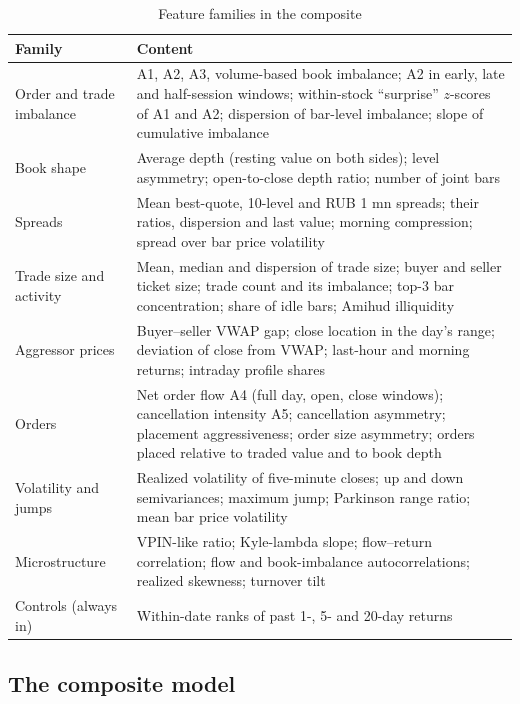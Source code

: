 \begin{table}[htbp]
\centering
\caption{Feature families in the composite}\label{tab:families}
\small
\begin{tabularx}{\textwidth}{@{}R{3.1cm}L@{}}
\toprule
Family & Content \\
\midrule
Order and trade imbalance & A1, A2, A3, volume-based book imbalance; A2 in early, late and half-session windows; within-stock ``surprise'' $z$-scores of A1 and A2; dispersion of bar-level imbalance; slope of cumulative imbalance \\
Book shape & Average depth (resting value on both sides); level asymmetry; open-to-close depth ratio; number of joint bars \\
Spreads & Mean best-quote, 10-level and RUB 1 mn spreads; their ratios, dispersion and last value; morning compression; spread over bar price volatility \\
Trade size and activity & Mean, median and dispersion of trade size; buyer and seller ticket size; trade count and its imbalance; top-3 bar concentration; share of idle bars; Amihud illiquidity \\
Aggressor prices & Buyer--seller VWAP gap; close location in the day's range; deviation of close from VWAP; last-hour and morning returns; intraday profile shares \\
Orders & Net order flow A4 (full day, open, close windows); cancellation intensity A5; cancellation asymmetry; placement aggressiveness; order size asymmetry; orders placed relative to traded value and to book depth \\
Volatility and jumps & Realized volatility of five-minute closes; up and down semivariances; maximum jump; Parkinson range ratio; mean bar price volatility \\
Microstructure & VPIN-like ratio; Kyle-lambda slope; flow--return correlation; flow and book-imbalance autocorrelations; realized skewness; turnover tilt \\
Controls (always in) & Within-date ranks of past 1-, 5- and 20-day returns \\
\bottomrule
\end{tabularx}
\end{table}

\subsection{The composite model}\label{sec:model}

